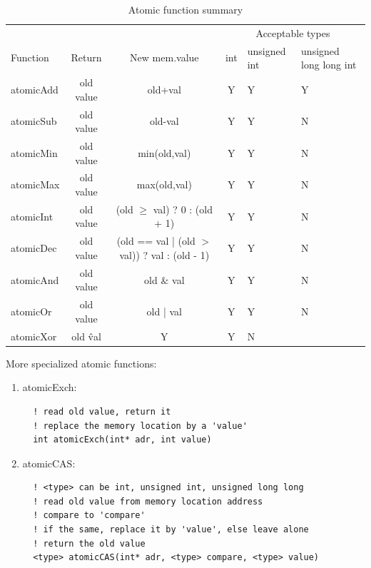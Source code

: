 \begin{table}[hbt]
\begin{center}
    \begin{tabular}{lcccp{2cm}p{2cm}}
        \hline
        & & & \multicolumn{3}{|c|}{Acceptable types} \\
        Function & Return & New mem.value & int & unsigned int & unsigned long
        long int \\
         \hline \hline
         atomicAdd & old value & old+val & Y & Y & Y \\
         atomicSub & old value & old-val & Y & Y & N \\
         atomicMin & old value & min(old,val) & Y & Y & N \\
         atomicMax &  old value & max(old,val) & Y & Y & N \\
         atomicInt & old value & (old $\ge$ val) ? 0 : (old + 1) & Y & Y & N \\
         atomicDec & old value & (old == val | (old $>$ val))  ? val : (old -
         1) & Y & Y & N \\
         atomicAnd & old value & old $\&$ val & Y & Y & N \\
         atomicOr & old value & old | val & Y & Y & N \\
         atomicXor & old \^ val & Y & Y & N         \\
        \hline
    \end{tabular}
\end{center}
\caption{Atomic function summary}
\label{tab:atomic_functions}
\end{table}

More specialized atomic functions:
\begin{enumerate}
  \item atomicExch:
  \begin{verbatim}
  ! read old value, return it
  ! replace the memory location by a 'value'
  int atomicExch(int* adr, int value)
  \end{verbatim}
  
  \item atomicCAS:
  \begin{verbatim}
  ! <type> can be int, unsigned int, unsigned long long
  ! read old value from memory location address
  ! compare to 'compare'
  ! if the same, replace it by 'value', else leave alone
  ! return the old value
  <type> atomicCAS(int* adr, <type> compare, <type> value)
  \end{verbatim}
\end{enumerate}

